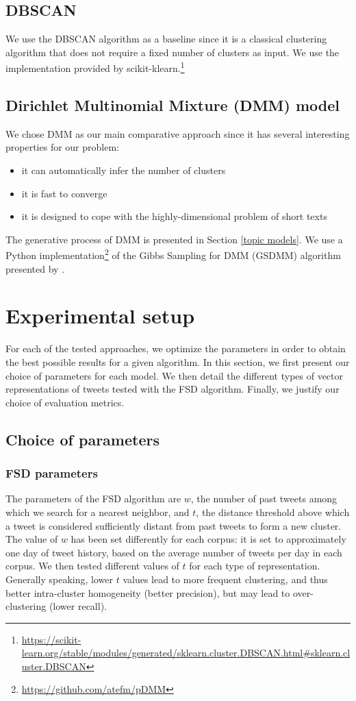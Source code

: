 \subsection{DBSCAN}
We use the DBSCAN algorithm \citep{ester1996density} as a baseline since it is a classical clustering algorithm that does not require a fixed number of clusters as input. We use the implementation provided by scikit-klearn.\footnote{\url{https://scikit-learn.org/stable/modules/generated/sklearn.cluster.DBSCAN.html\#sklearn.cluster.DBSCAN}}

\subsection{Dirichlet Multinomial Mixture (DMM) model}
We chose DMM as our main comparative approach since it has several interesting properties for our problem: \begin{itemize}
    \item it can automatically infer the number of clusters
    \item it is fast to converge
    \item it is designed to cope with the highly-dimensional problem of short texts
\end{itemize}

The generative process of DMM is presented in Section \ref{topic models}. We use a Python implementation\footnote{\url{https://github.com/atefm/pDMM}} of the Gibbs Sampling for DMM (GSDMM) algorithm presented by \citet{yin_dirichlet_2014}.

\section{Experimental setup}

For each of the tested approaches, we optimize the parameters in order to obtain the best possible results for a given algorithm. In this section, we first present our choice of parameters for each model. We then detail the different types of vector representations of tweets tested with the FSD algorithm. Finally, we justify our choice of evaluation metrics.

\subsection{Choice of parameters}
\label{SubSec: Choice of parameters}
\subsubsection{FSD parameters}
The parameters of the FSD algorithm are $w$, the number of past tweets among which we search for a nearest neighbor, and $t$, the distance threshold above which a tweet is considered sufficiently distant from past tweets to form a new cluster. The value of $w$ has been set differently for each corpus: it is set to approximately one day of tweet history, based on the average number of tweets per day in each corpus. We then tested different values of $t$ for each type of representation. Generally speaking, lower $t$ values lead to more frequent clustering, and thus better intra-cluster homogeneity (better precision), but may lead to over-clustering (lower recall).

